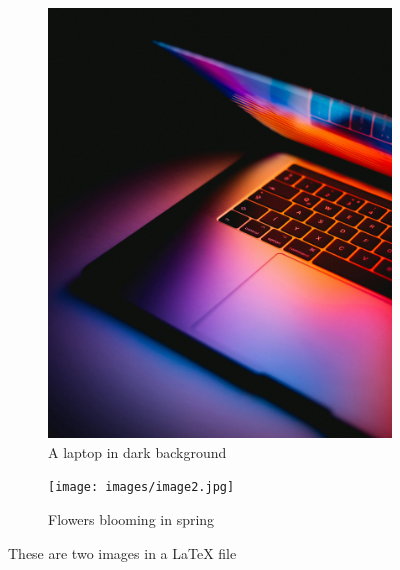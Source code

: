 \documentclass{article}
\begin{document}
	
	\begin{figure}
		\centering
		\begin{subfigure}{0.46\linewidth}  %
			\includegraphics[width=\linewidth]{images/image1.jpg}  %
			\caption{A laptop in dark background}  %
			\label{fig:subfig1}  %
		\end{subfigure}
		\hfill  %
		\begin{subfigure}{0.44\linewidth}  %
			\texttt{[image: images/image2.jpg]}  %
			\caption{Flowers blooming in spring}  %
			\label{fig:subfig2}  %
		\end{subfigure}
		\caption{These are two images in a LaTeX file }  %
		\label{fig:subfigures}  %
	\end{figure}
	
\end{document}
